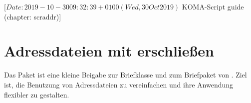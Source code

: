 %
%
%
%
%
%
%
%
% 
%
%
%
%

                 [$Date: 2019-10-30 09:32:39 +0100 (Wed, 30 Oct 2019) $
                  KOMA-Script guide (chapter: scraddr)]

\chapter{Adressdateien mit  erschließen}%
%
\BeginIndexGroup
{}

Das Paket  ist eine kleine Beigabe zur Briefklasse und zum
Briefpaket von \KOMAScript.  Ziel ist, die Benutzung von Adressdateien zu
vereinfachen und ihre Anwendung flexibler zu gestalten.

